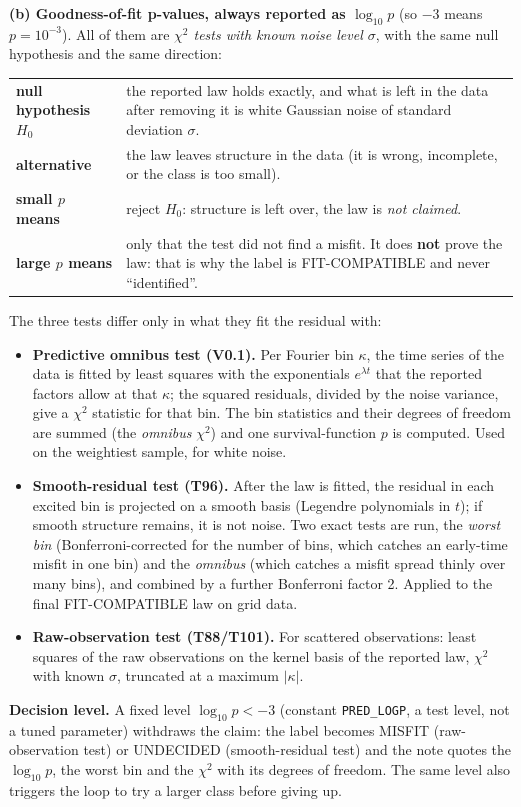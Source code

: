 \documentclass[11pt,a4paper]{article}
\newcommand{\code}[1]{\texttt{#1}}
\begin{document}
\textbf{(b) Goodness-of-fit p-values, always reported as $\log_{10}p$} (so $-3$ means $p=10^{-3}$). All of them are \emph{$\chi^2$ tests with known noise level $\sigma$}, with the same null hypothesis and the same direction:
\begin{center}\small
\begin{tabular}{L{4.2cm}L{9.8cm}}\toprule
\textbf{null hypothesis $H_0$} & the reported law holds exactly, and what is left in the data after removing it is white Gaussian noise of standard deviation $\sigma$.\\
\textbf{alternative} & the law leaves structure in the data (it is wrong, incomplete, or the class is too small).\\
\textbf{small $p$ means} & reject $H_0$: structure is left over, the law is \emph{not claimed}.\\
\textbf{large $p$ means} & only that the test did not find a misfit. It does \textbf{not} prove the law: that is why the label is FIT-COMPATIBLE and never ``identified''.\\\bottomrule
\end{tabular}
\end{center}
The three tests differ only in what they fit the residual with:
\begin{itemize}
\item \textbf{Predictive omnibus test (V0.1).} Per Fourier bin $\kappa$, the time series of the data is fitted by least squares with the exponentials $e^{\lambda t}$ that the reported factors allow at that $\kappa$; the squared residuals, divided by the noise variance, give a $\chi^2$ statistic for that bin. The bin statistics and their degrees of freedom are summed (the \emph{omnibus} $\chi^2$) and one survival-function $p$ is computed. Used on the weightiest sample, for white noise.
\item \textbf{Smooth-residual test (T96).} After the law is fitted, the residual in each excited bin is projected on a smooth basis (Legendre polynomials in $t$); if smooth structure remains, it is not noise. Two exact tests are run, the \emph{worst bin} (Bonferroni-corrected for the number of bins, which catches an early-time misfit in one bin) and the \emph{omnibus} (which catches a misfit spread thinly over many bins), and combined by a further Bonferroni factor 2. Applied to the final FIT-COMPATIBLE law on grid data.
\item \textbf{Raw-observation test (T88/T101).} For scattered observations: least squares of the raw observations on the kernel basis of the reported law, $\chi^2$ with known $\sigma$, truncated at a maximum $|\kappa|$.
\end{itemize}
\textbf{Decision level.} A fixed level $\log_{10}p<-3$ (constant \code{PRED\_LOGP}, a test level, not a tuned parameter) withdraws the claim: the label becomes MISFIT (raw-observation test) or UNDECIDED (smooth-residual test) and the note quotes the $\log_{10}p$, the worst bin and the $\chi^2$ with its degrees of freedom. The same level also triggers the loop to try a larger class before giving up.
\end{document}
